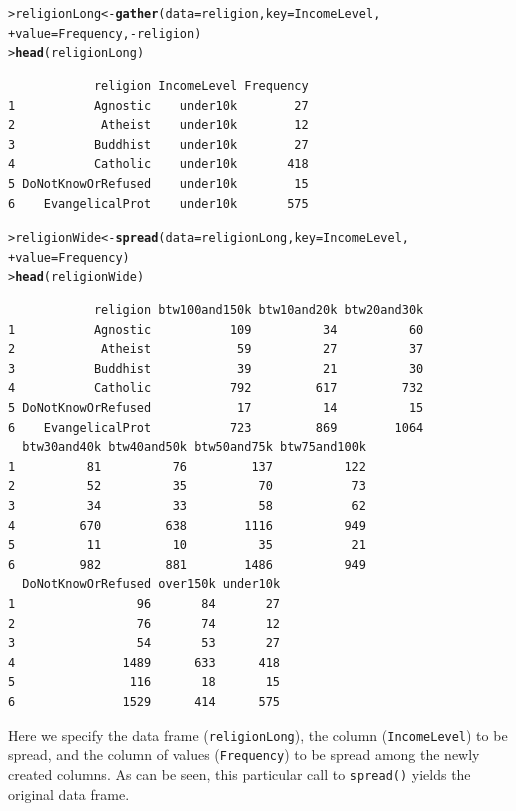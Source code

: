\documentclass[12pt,oneside]{book}\usepackage[]{graphicx}\usepackage[]{color}
\makeatletter
\newcommand{\hlopt}[1]{\textcolor[rgb]{0,0,0}{#1}}%
\newcommand{\hlstd}[1]{\textcolor[rgb]{0.345,0.345,0.345}{#1}}%
\newcommand{\hlkwb}[1]{\textcolor[rgb]{0.69,0.353,0.396}{#1}}%
\newcommand{\hlkwc}[1]{\textcolor[rgb]{0.333,0.667,0.333}{#1}}%
\newcommand{\hlkwd}[1]{\textcolor[rgb]{0.737,0.353,0.396}{\textbf{#1}}}%
\newenvironment{kframe}{%
 \def\at@end@of@kframe{}%
 \ifinner\ifhmode%
  \def\at@end@of@kframe{\end{minipage}}%
  \begin{minipage}{\columnwidth}%
 \fi\fi%
 \def\FrameCommand##1{\hskip\@totalleftmargin \hskip-\fboxsep
 \colorbox{shadecolor}{##1}\hskip-\fboxsep
     \hskip-\linewidth \hskip-\@totalleftmargin \hskip\columnwidth}%
 \MakeFramed {\advance\hsize-\width
   \@totalleftmargin\z@ \linewidth\hsize
   \@setminipage}}%
 {\par\unskip\endMakeFramed%
 \at@end@of@kframe}
\newenvironment{knitrout}{}{} %
\makeatother
\begin{document}
\begin{knitrout}
\color{fgcolor}\begin{kframe}
\begin{alltt}
\hlstd{> }\hlstd{religionLong} \hlkwb{<-} \hlkwd{gather}\hlstd{(}\hlkwc{data} \hlstd{= religion,} \hlkwc{key} \hlstd{= IncomeLevel,}
\hlstd{+ }                       \hlkwc{value} \hlstd{= Frequency,} \hlopt{-}\hlstd{religion)}
\hlstd{> }\hlkwd{head}\hlstd{(religionLong)}
\end{alltt}
\begin{verbatim}
            religion IncomeLevel Frequency
1           Agnostic    under10k        27
2            Atheist    under10k        12
3           Buddhist    under10k        27
4           Catholic    under10k       418
5 DoNotKnowOrRefused    under10k        15
6    EvangelicalProt    under10k       575
\end{verbatim}
\end{kframe}
\end{knitrout}

\begin{knitrout}
\color{fgcolor}\begin{kframe}
\begin{alltt}
\hlstd{> }\hlstd{religionWide} \hlkwb{<-} \hlkwd{spread}\hlstd{(}\hlkwc{data} \hlstd{= religionLong,} \hlkwc{key} \hlstd{= IncomeLevel,}
\hlstd{+ }    \hlkwc{value} \hlstd{= Frequency)}
\hlstd{> }\hlkwd{head}\hlstd{(religionWide)}
\end{alltt}
\begin{verbatim}
            religion btw100and150k btw10and20k btw20and30k
1           Agnostic           109          34          60
2            Atheist            59          27          37
3           Buddhist            39          21          30
4           Catholic           792         617         732
5 DoNotKnowOrRefused            17          14          15
6    EvangelicalProt           723         869        1064
  btw30and40k btw40and50k btw50and75k btw75and100k
1          81          76         137          122
2          52          35          70           73
3          34          33          58           62
4         670         638        1116          949
5          11          10          35           21
6         982         881        1486          949
  DoNotKnowOrRefused over150k under10k
1                 96       84       27
2                 76       74       12
3                 54       53       27
4               1489      633      418
5                116       18       15
6               1529      414      575
\end{verbatim}
\end{kframe}
\end{knitrout}
Here we specify the data frame (\verb+religionLong+), the column (\verb+IncomeLevel+) to be spread, and the column of values (\verb+Frequency+) to be spread among the newly created columns. As can be seen, this particular call to \verb+spread()+ yields the original data frame.
\end{document}
